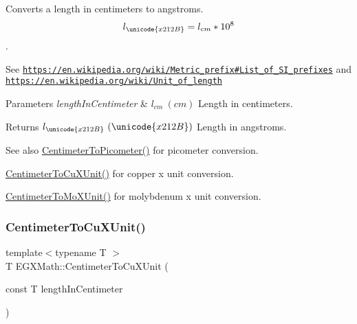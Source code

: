 Converts a length in centimeters to angstroms. \[ l_{\unicode{x212B}}=l_{cm} * 10^{8} \]. 

See \href{https://en.wikipedia.org/wiki/Metric_prefix#List_of_SI_prefixes}{\tt https\+://en.\+wikipedia.\+org/wiki/\+Metric\+\_\+prefix\#\+List\+\_\+of\+\_\+\+S\+I\+\_\+prefixes} and \href{https://en.wikipedia.org/wiki/Unit_of_length}{\tt https\+://en.\+wikipedia.\+org/wiki/\+Unit\+\_\+of\+\_\+length} 
\begin{DoxyParams}{Parameters}
{\em length\+In\+Centimeter} & $ l_{cm}\ (cm)$ Length in centimeters. \\
\hline
\end{DoxyParams}
\begin{DoxyReturn}{Returns}
$ l_{\unicode{x212B}}\ (\unicode{x212B})$ Length in angstroms. 
\end{DoxyReturn}
\begin{DoxySeeAlso}{See also}
\mbox{\hyperlink{group___e_g_x_math-_conversions-_length_conversions-_s_i-_centimeter-_s_i_ga7e2851b0052f1b135a84aa860495e4ba}{Centimeter\+To\+Picometer()}} for picometer conversion. 

\mbox{\hyperlink{group___e_g_x_math-_conversions-_length_conversions-_s_i-_centimeter-_non-_s_i_ga98d44269c80a1c5ab7c38d27aba39517}{Centimeter\+To\+Cu\+X\+Unit()}} for copper x unit conversion. 

\mbox{\hyperlink{group___e_g_x_math-_conversions-_length_conversions-_s_i-_centimeter-_non-_s_i_ga4e94aa6f1cc6aaeb751384a8472b01fd}{Centimeter\+To\+Mo\+X\+Unit()}} for molybdenum x unit conversion. 
\end{DoxySeeAlso}
\mbox{\label{group___e_g_x_math-_conversions-_length_conversions-_s_i-_centimeter-_non-_s_i_ga98d44269c80a1c5ab7c38d27aba39517}} 
\subsubsection{\texorpdfstring{Centimeter\+To\+Cu\+X\+Unit()}{CentimeterToCuXUnit()}}
{\footnotesize\ttfamily template$<$typename T $>$ \\
T E\+G\+X\+Math\+::\+Centimeter\+To\+Cu\+X\+Unit (\begin{DoxyParamCaption}\item[{const T}]{length\+In\+Centimeter }\end{DoxyParamCaption})}



